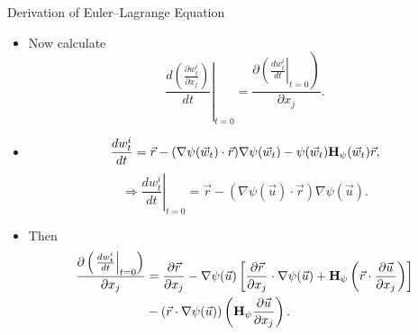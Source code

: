 \documentclass{beamer}
\begin{document}
\begin{frame}{Derivation of Euler--Lagrange Equation}
  \begin{itemize}
\item Now calculate \begin{equation}
\left.\frac{d\left(\frac{\partial w^i_t}{\partial x_j}\right)}{d t}\right\vert_{t=0}=\frac{\partial 
\left. \left(\frac{d w_t^i}{d t}\right\vert_{t=0}\right)}{\partial x_j}.
\end{equation}
\item $$\frac{d w_t^i}{d t} = \vec{r} - (\nabla \psi (\vec{w}_t) \cdot \vec{r} ) \nabla \psi (\vec{w}_t ) - \psi (\vec{w}_t ) {\bf H}_{\psi}(\vec{w}_t) \vec{r},$$ $$\Rightarrow \left.\frac{d w_t^i}{d t}\right\vert_{t=0} = \vec{r} - (\nabla \psi (\vec{u}) \cdot \vec{r} ) \nabla \psi (\vec{u} ).$$
\item Then
\begin{align*}
\frac{\partial \left(\left.\frac{d w_t^i}{d t}\right\vert_{t=0}\right)}{\partial x_j} &= \frac{\partial \vec{r}}{\partial x_j} - \nabla \psi (\vec{u}) \left[ \frac{\partial \vec{r}}{\partial x_j} \cdot \nabla \psi (\vec{u}) + {\bf H}_{\psi} \left( \vec{r} \cdot \frac{\partial \vec{u}}{\partial x_j} \right) \right] \\
&- (\vec{r}\cdot \nabla \psi(\vec{u}) ) \left( {\bf H}_{\psi} \frac{\partial \vec{u}}{\partial x_j}\right).
\end{align*}
  \end{itemize}
\end{frame}
\end{document}
